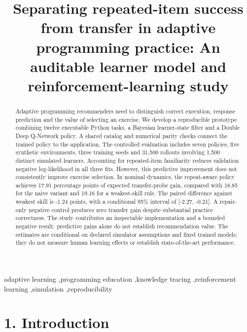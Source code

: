\documentclass[preprint,11pt,authoryear]{elsarticle}
\begin{document}
\begin{frontmatter}

\title{Separating repeated-item success from transfer in adaptive programming practice: An auditable learner model and reinforcement-learning study}

\begin{abstract}

Adaptive programming recommenders need to distinguish correct execution, response prediction and the value of selecting an exercise. We develop a reproducible prototype combining twelve executable Python tasks, a Bayesian learner-state filter and a Double Deep Q-Network policy. A shared catalog and numerical parity checks connect the trained policy to the application. The controlled evaluation includes seven policies, five synthetic environments, three training seeds and 31,500 rollouts involving 1,500 distinct simulated learners. Accounting for repeated-item familiarity reduces validation negative log-likelihood in all three fits. However, this predictive improvement does not consistently improve exercise selection. In nominal dynamics, the repeat-aware policy achieves 17.91 percentage points of expected transfer-probe gain, compared with 18.85 for the naive variant and 19.16 for a weakest-skill rule. The paired difference against weakest skill is -1.24 points, with a conditional 95\% interval of [-2.27, -0.21]. A repair-only negative control produces zero transfer gain despite substantial practice correctness. The study contributes an inspectable implementation and a bounded negative result: predictive gains alone do not establish recommendation value. The estimates are conditional on declared simulator assumptions and fixed trained models; they do not measure human learning effects or establish state-of-the-art performance.

\end{abstract}

\begin{keyword}

adaptive learning \sep programming education \sep knowledge tracing \sep reinforcement learning \sep simulation \sep reproducibility

\end{keyword}

\end{frontmatter}

\fontsize{11}{14.5}\selectfont

\section*{1. Introduction}
\end{document}
